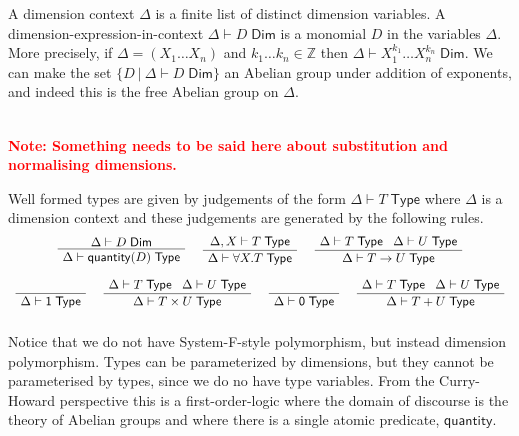 \documentclass[a4paper,UKenglish]{lipics}
\newcommand\note[1]{{ \bf \textcolor{red} {\vspace{2mm}\; \\ Note: #1\\}}}
\newcommand{\msf}[1]{\mathsf{#1}} %
\newcommand{\Ab}{\msf{Ab}}
\newcommand{\LAb}{\msf{L}_{\msf{Ab}}}
\newcommand{\C}{\mathcal{C}}
\newcommand{\unitTy}{\msf{1}}
\newcommand{\emptyTy}{\msf{0}}
\newcommand{\qnt}{\msf{quantity}}
\newcommand{\Tj}[2]{#1 \vdash #2 \; \msf{ Type}}
\newcommand{\Dj}[2]{#1 \vdash #2 \; \msf{ Dim}}
\newcommand{\Dim}{D}
\newcommand{\Dvar}{X}
\begin{document}
\vspace{3mm} 
A dimension context $\Delta$ is a finite list of distinct
dimension variables.
A dimension-expression-in-context $\Dj\Delta \Dim$ is a monomial
$\Dim$ in the variables $\Delta$.
More precisely,
if $\Delta=(\Dvar_1\dots \Dvar_n)$ and $k_1\dots k_n\in\mathbb Z$
then $\Dj \Delta{\Dvar_1^{k_1}\dots \Dvar_n^{k_n}}$.
We can make the set $\{\Dim~|~\Dj \Delta \Dim\}$ an Abelian group under addition of
exponents, and indeed this is the free Abelian group on $\Delta$.

\note{Something needs to be said here about substitution and normalising dimensions.}


\vspace{3mm}  Well formed types are given by judgements of the form $\Tj\Delta  T$ where
$\Delta$ is a dimension context and these judgements are generated by the following rules.
\[\begin{array}{c}
\AxiomC{$\Dj\Delta \Dim$}
		\UnaryInfC{$\Tj\Delta {\qnt(\Dim)}$}
		\DisplayProof

\hspace{5mm}
\AxiomC{$\Tj {\Delta, \Dvar}  T$}
	\UnaryInfC{$\Tj \Delta{ \forall \Dvar.T} $}
	\DisplayProof
\hspace{5mm}
\AxiomC{$\Delta \vdash T \; \msf{ Type} \; \; \; \Delta \vdash U \; \msf{ Type}$}
	\UnaryInfC{$\Delta \vdash T \rightarrow U  \; \msf{ Type}$}
	\DisplayProof
\\ \\
\AxiomC{  $\phantom{\vdash T \; \msf{ Type}}$ }
		\UnaryInfC{$\Delta \vdash \unitTy \; \msf{ Type}$}
	\DisplayProof
\hspace{5mm}
\AxiomC{$\Delta \vdash T \; \msf{ Type} \; \; \; \Delta \vdash U \; \msf{ Type}$}
	\UnaryInfC{$\Delta \vdash T\times U \; \msf{ Type}$}
	\DisplayProof
\hspace{5mm}
\AxiomC{  $\phantom{ \vdash T \; \msf{ Type}}$ }
		\UnaryInfC{$\Delta \vdash \emptyTy \; \msf{ Type}$}
	\DisplayProof
\hspace{5mm}
\AxiomC{$\Delta \vdash T \; \msf{ Type} \; \; \; \Delta \vdash U \; \msf{ Type}$}
	\UnaryInfC{$\Delta \vdash T + U \; \msf{ Type}$}
	\DisplayProof
\\ \\
\end{array}\]
Notice that we do not have System-F-style polymorphism, but instead dimension polymorphism. Types can be parameterized by dimensions, but they cannot be parameterised by types, since we do no have type variables. From the Curry-Howard perspective this is a first-order-logic where the domain of discourse is the theory of Abelian groups and where there is a single atomic predicate, $\qnt$.
\end{document}
